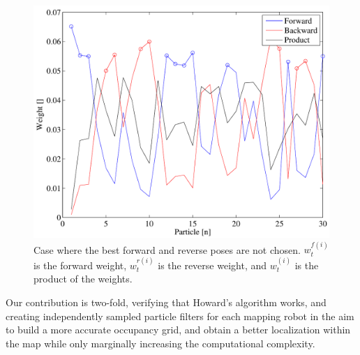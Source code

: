 \begin{figure}[h]
\centering
\includegraphics[width=\columnwidth]{../FinalFigures/Depletion}
\caption{Case where the best forward and reverse poses are not chosen. $w^{f(i)}_{t}$ is the forward weight, $w^{r(i)}_{t}$ is the reverse weight, and $w^{(i)}_t$ is the product of the weights.}
\label{fig:deplete}
\end{figure}

Our contribution is two-fold, verifying that Howard's algorithm works, and creating independently sampled particle filters for each mapping robot in the aim to build a more accurate occupancy grid, and obtain a better localization within the map while only marginally increasing the computational complexity.

